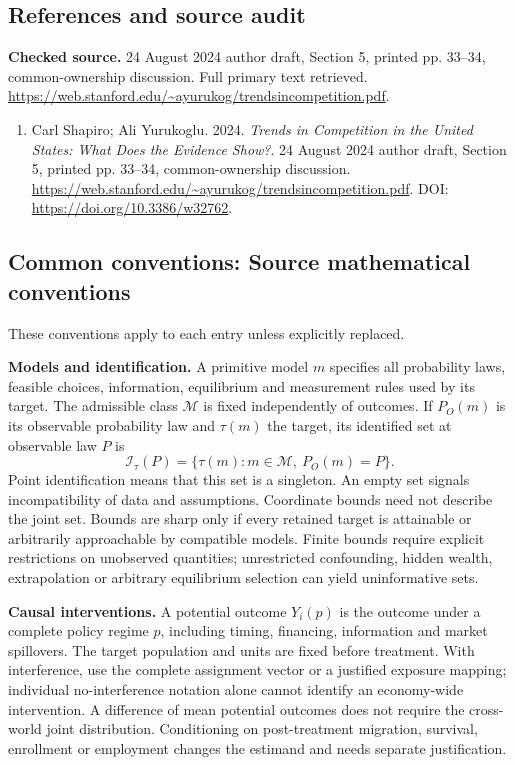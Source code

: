 \documentclass[11pt,a4paper]{article}
\begin{document}
\subsection*{References and source audit}
\textbf{Checked source.} 24 August 2024 author draft, Section 5, printed pp. 33--34, common-ownership discussion. Full primary text retrieved. \url{https://web.stanford.edu/~ayurukog/trendsincompetition.pdf}.
\begin{enumerate}\raggedright
\item\hypertarget{definitions:source:30007679:1}{} Carl Shapiro; Ali Yurukoglu. 2024. \emph{Trends in Competition in the United States: What Does the Evidence Show?}. 24 August 2024 author draft, Section 5, printed pp. 33--34, common-ownership discussion.
\url{https://web.stanford.edu/~ayurukog/trendsincompetition.pdf}.
DOI: \url{https://doi.org/10.3386/w32762}.
\end{enumerate}

\subsection*{Common conventions: Source mathematical conventions}

These conventions apply to each entry unless explicitly replaced.

\textbf{Models and identification.} A primitive model \(m\) specifies all probability laws, feasible choices, information, equilibrium and measurement rules used by its target. The admissible class \(\mathcal M\) is fixed independently of outcomes. If \(P_O(m)\) is its observable probability law and \(\tau(m)\) the target, its identified set at observable law \(P\) is
\[
 \mathcal I_\tau(P)=\{\tau(m):m\in\mathcal M,\ P_O(m)=P\}.
\]
Point identification means that this set is a singleton. An empty set signals incompatibility of data and assumptions. Coordinate bounds need not describe the joint set. Bounds are sharp only if every retained target is attainable or arbitrarily approachable by compatible models. Finite bounds require explicit restrictions on unobserved quantities; unrestricted confounding, hidden wealth, extrapolation or arbitrary equilibrium selection can yield uninformative sets.

\textbf{Causal interventions.} A potential outcome \(Y_i(p)\) is the outcome under a complete policy regime \(p\), including timing, financing, information and market spillovers. The target population and units are fixed before treatment. With interference, use the complete assignment vector or a justified exposure mapping; individual no-interference notation alone cannot identify an economy-wide intervention. A difference of mean potential outcomes does not require the cross-world joint distribution. Conditioning on post-treatment migration, survival, enrollment or employment changes the estimand and needs separate justification.
\end{document}
